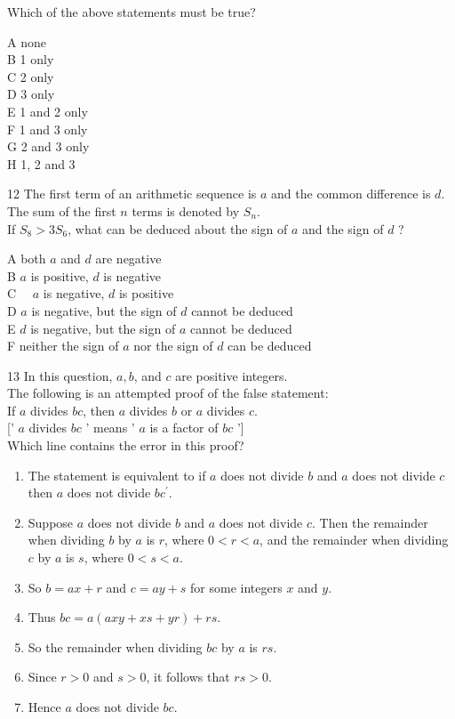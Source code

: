 \documentclass[10pt]{article}
\begin{document}
Which of the above statements must be true?

A none\\
B 1 only\\
C 2 only\\
D 3 only\\
E 1 and 2 only\\
F 1 and 3 only\\
G 2 and 3 only\\
H 1, 2 and 3

12 The first term of an arithmetic sequence is $a$ and the common difference is $d$.\\
The sum of the first $n$ terms is denoted by $S_{n}$.\\
If $S_{8}>3 S_{6}$, what can be deduced about the sign of $a$ and the sign of $d$ ?

A both $a$ and $d$ are negative\\
B $a$ is positive, $d$ is negative\\
C $\quad a$ is negative, $d$ is positive\\
D $a$ is negative, but the sign of $d$ cannot be deduced\\
E $d$ is negative, but the sign of $a$ cannot be deduced\\
F neither the sign of $a$ nor the sign of $d$ can be deduced

13 In this question, $a, b$, and $c$ are positive integers.\\
The following is an attempted proof of the false statement:\\
If $a$ divides $b c$, then $a$ divides $b$ or $a$ divides $c$.\\[0pt]
[' $a$ divides $b c$ ' means ' $a$ is a factor of $b c$ ']\\
Which line contains the error in this proof?

\begin{enumerate}
  \item The statement is equivalent to if $a$ does not divide $b$ and $a$ does not divide $c$ then $a$ does not divide $b c^{\prime}$.
  \item Suppose $a$ does not divide $b$ and $a$ does not divide $c$. Then the remainder when dividing $b$ by $a$ is $r$, where $0<r<a$, and the remainder when dividing $c$ by $a$ is $s$, where $0<s<a$.
  \item So $b=a x+r$ and $c=a y+s$ for some integers $x$ and $y$.
  \item Thus $b c=a(a x y+x s+y r)+r s$.
  \item So the remainder when dividing $b c$ by $a$ is $r s$.
  \item Since $r>0$ and $s>0$, it follows that $r s>0$.
  \item Hence $a$ does not divide $b c$.
\end{enumerate}
\end{document}
